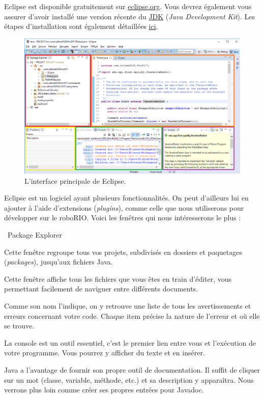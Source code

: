 \documentclass[12pt]{report}
\begin{document}
Eclipse est disponible gratuitement sur \href{https://www.eclipse.org}{eclipse.org}. Vous devrez également vous assurer d'avoir installé une version récente du \href{http://www.oracle.com/technetwork/java/javase/downloads/index.html}{JDK} (\emph{Java Development Kit}). Les étapes d'installation sont également détaillées \href{http://wpilib.screenstepslive.com/s/4485/m/13809/l/599681-installing-eclipse-c-java}{ici}.

%
\begin{figure}[!htb]
  \centering
  \includegraphics[width=\textwidth]{interface-eclipse.png}
  \caption{L'interface principale de Eclipse.}
\end{figure}
%
Eclipse est un logiciel ayant plusieurs fonctionnalités. On peut d'ailleurs lui en ajouter à l'aide d'extensions (\emph{plugins}), comme celle que nous utiliserons pour développer sur le roboRIO. Voici les fenêtres qui nous intéresserons le plus :

\begin{labeling}{\ Package Explorer\ }
%
\item[\colorbox{ec-red}{\emph{Package Explorer}}] Cette fenêtre regroupe tous vos projets, subdivisés en dossiers et paquetages (\emph{packages}), jusqu'aux fichiers Java.
%
\item[\colorbox{ec-orange}{Fenêtre d'édition}] Cette fenêtre affiche tous les fichiers que vous êtes en train d'éditer, vous permettant facilement de naviguer entre différents documents.
%
\item[\colorbox{ec-yellow}{\emph{Problems}}] Comme son nom l'indique, on y retrouve une liste de tous les avertissements et erreurs concernant votre code. Chaque item précise la nature de l'erreur et où elle se trouve.
%
\item[\colorbox{ec-green}{Console}] La console est un outil essentiel, c'est le premier lien entre vous et l'exécution de votre programme. Vous pourrez y afficher du texte et en insérer.
%
\item[\colorbox{ec-purple}{Javadoc}] Java a l'avantage de fournir son propre outil de documentation. Il suffit de cliquer sur un mot (classe, variable, méthode, etc.) et sa description y apparaîtra. Nous verrons plus loin comme créer ses propres entrées pour Javadoc.
\end{labeling}
\end{document}
